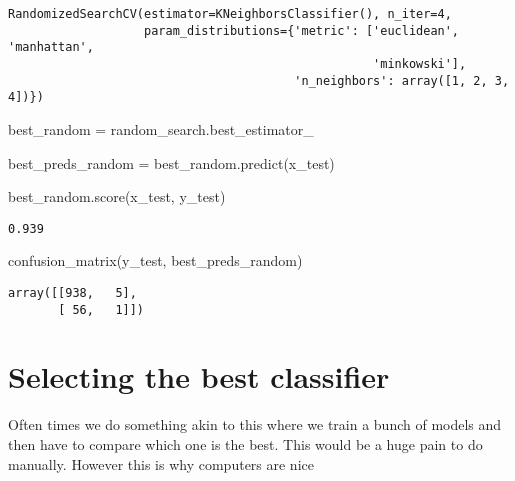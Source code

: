 \documentclass[
  letterpaper,
  DIV=11,
  numbers=noendperiod]{scrreprt}
\newenvironment{Shaded}{\begin{snugshade}}{\end{snugshade}}
\newcommand{\NormalTok}[1]{\textcolor[rgb]{0.00,0.23,0.31}{#1}}
\newcommand{\OperatorTok}[1]{\textcolor[rgb]{0.37,0.37,0.37}{#1}}
\begin{document}
\begin{verbatim}
RandomizedSearchCV(estimator=KNeighborsClassifier(), n_iter=4,
                   param_distributions={'metric': ['euclidean', 'manhattan',
                                                   'minkowski'],
                                        'n_neighbors': array([1, 2, 3, 4])})
\end{verbatim}

\begin{Shaded}
\begin{Highlighting}[]
\NormalTok{best\_random }\OperatorTok{=}\NormalTok{ random\_search.best\_estimator\_}

\NormalTok{best\_preds\_random }\OperatorTok{=}\NormalTok{ best\_random.predict(x\_test)}

\NormalTok{best\_random.score(x\_test, y\_test)}
\end{Highlighting}
\end{Shaded}

\begin{verbatim}
0.939
\end{verbatim}

\begin{Shaded}
\begin{Highlighting}[]
\NormalTok{confusion\_matrix(y\_test, best\_preds\_random)}
\end{Highlighting}
\end{Shaded}

\begin{verbatim}
array([[938,   5],
       [ 56,   1]])
\end{verbatim}

\section{Selecting the best
classifier}\label{selecting-the-best-classifier}

Often times we do something akin to this where we train a bunch of
models and then have to compare which one is the best. This would be a
huge pain to do manually. However this is why computers are nice
\end{document}
